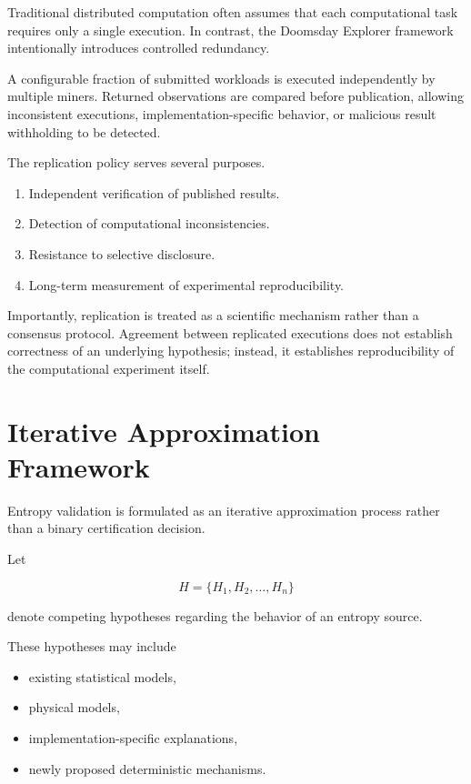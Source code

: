 \documentclass[11pt]{article}
\begin{document}
Traditional distributed computation often assumes
that each computational task requires only a single execution.
In contrast,
the Doomsday Explorer framework intentionally introduces
controlled redundancy.

A configurable fraction of submitted workloads
is executed independently by multiple miners.
Returned observations are compared
before publication,
allowing inconsistent executions,
implementation-specific behavior,
or malicious result withholding
to be detected.

The replication policy serves several purposes.

\begin{enumerate}

\item
Independent verification of published results.

\item
Detection of computational inconsistencies.

\item
Resistance to selective disclosure.

\item
Long-term measurement of experimental reproducibility.

\end{enumerate}

Importantly,
replication is treated as a scientific mechanism
rather than a consensus protocol.
Agreement between replicated executions
does not establish correctness of an underlying hypothesis;
instead,
it establishes reproducibility of the computational experiment itself.


\section{Iterative Approximation Framework}

Entropy validation is formulated as
an iterative approximation process
rather than a binary certification decision.

Let

\[
H
=
\{H_1,H_2,\ldots,H_n\}
\]

denote competing hypotheses
regarding the behavior of an entropy source.

These hypotheses may include

\begin{itemize}

\item
existing statistical models,

\item
physical models,

\item
implementation-specific explanations,

\item
newly proposed deterministic mechanisms.

\end{itemize}
\end{document}
